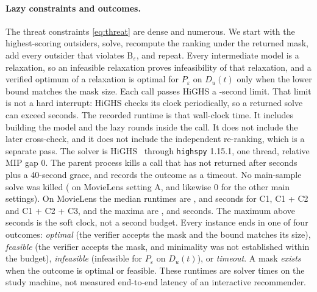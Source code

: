 \documentclass[11pt]{article}
\newcommand{\Peps}{P_\varepsilon}
\begin{document}
\paragraph{Lazy constraints and outcomes.} The threat constraints \eqref{eq:threat} are dense and numerous. We start
with the \ThreatInit{} highest-scoring outsiders, solve, recompute the ranking under the returned mask, add every
outsider that violates B$_\varepsilon$, and repeat. Every intermediate model is a relaxation, so an infeasible
relaxation proves infeasibility of that relaxation, and a verified optimum of a relaxation is optimal for $\Peps$ on
$D_u(t)$ only when the lower bound matches the mask size. Each call passes HiGHS a \TimeLimit-second limit. That
limit is not a hard interrupt: HiGHS checks its clock periodically, so a returned solve can exceed \TimeLimit{}
seconds. The recorded runtime is that wall-clock time. It includes building the model and the lazy rounds inside the
call. It does not include the later cross-check, and it does not include the independent re-ranking, which is a
separate pass. The solver is HiGHS~\cite{huangfu2018highs} through \texttt{highspy} 1.15.1, one thread, relative MIP
gap 0. The parent process kills a call that has not returned after \TimeLimit{} seconds plus a 40-second grace, and
records the outcome as a timeout. No main-sample solve was killed (\MLAKilled{} on MovieLens setting A, and likewise
0 for the other main settings). On MovieLens the median runtimes are \MLATime, \MLBTime{} and \MLCTime{} seconds for
C1, C1 + C2 and C1 + C2 + C3, and the maxima are \MLATimeMax, \MLBTimeMax{} and \MLCTimeMax{} seconds. The maximum
above \TimeLimit{} seconds is the soft clock, not a second budget. Every instance ends in one of four outcomes:
\emph{optimal} (the verifier accepts the mask and the bound matches its size), \emph{feasible} (the verifier accepts
the mask, and minimality was not established within the budget), \emph{infeasible} (infeasible for $\Peps$ on
$D_u(t)$), or \emph{timeout}. A mask \emph{exists} when the outcome is optimal or feasible. These runtimes are solver
times on the study machine, not measured end-to-end latency of an interactive recommender.
\end{document}
